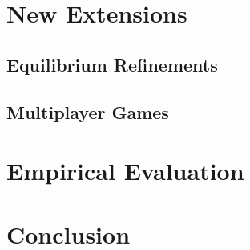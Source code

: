 \documentclass{aamas2013}
\begin{document}
\section{New Extensions}

\subsection{Equilibrium Refinements}

\subsection{Multiplayer Games}

\section{Empirical Evaluation}

\section{Conclusion}




\end{document}
